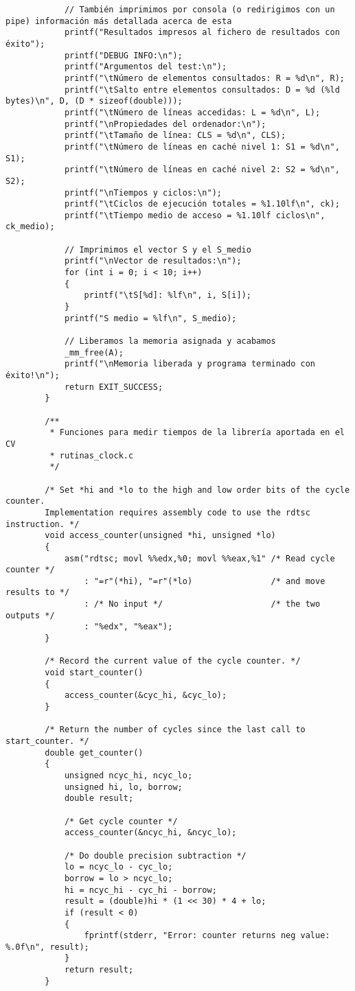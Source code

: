 \documentclass[a4paper,twocolumn]{article}
\begin{document}
\begin{lstlisting}
            // También imprimimos por consola (o redirigimos con un pipe) información más detallada acerca de esta
            printf("Resultados impresos al fichero de resultados con éxito");
            printf("DEBUG INFO:\n");
            printf("Argumentos del test:\n");
            printf("\tNúmero de elementos consultados: R = %d\n", R);
            printf("\tSalto entre elementos consultados: D = %d (%ld bytes)\n", D, (D * sizeof(double)));
            printf("\tNúmero de líneas accedidas: L = %d\n", L);
            printf("\nPropiedades del ordenador:\n");
            printf("\tTamaño de línea: CLS = %d\n", CLS);
            printf("\tNúmero de líneas en caché nivel 1: S1 = %d\n", S1);
            printf("\tNúmero de líneas en caché nivel 2: S2 = %d\n", S2);
            printf("\nTiempos y ciclos:\n");
            printf("\tCiclos de ejecución totales = %1.10lf\n", ck);
            printf("\tTiempo medio de acceso = %1.10lf ciclos\n", ck_medio);
        
            // Imprimimos el vector S y el S_medio
            printf("\nVector de resultados:\n");
            for (int i = 0; i < 10; i++)
            {
                printf("\tS[%d]: %lf\n", i, S[i]);
            }
            printf("S medio = %lf\n", S_medio);
        
            // Liberamos la memoria asignada y acabamos
            _mm_free(A);
            printf("\nMemoria liberada y programa terminado con éxito!\n");
            return EXIT_SUCCESS;
        }
        
        /**
         * Funciones para medir tiempos de la librería aportada en el CV
         * rutinas_clock.c
         */
        
        /* Set *hi and *lo to the high and low order bits of the cycle counter.
        Implementation requires assembly code to use the rdtsc instruction. */
        void access_counter(unsigned *hi, unsigned *lo)
        {
            asm("rdtsc; movl %%edx,%0; movl %%eax,%1" /* Read cycle counter */
                : "=r"(*hi), "=r"(*lo)                /* and move results to */
                : /* No input */                      /* the two outputs */
                : "%edx", "%eax");
        }
        
        /* Record the current value of the cycle counter. */
        void start_counter()
        {
            access_counter(&cyc_hi, &cyc_lo);
        }
        
        /* Return the number of cycles since the last call to start_counter. */
        double get_counter()
        {
            unsigned ncyc_hi, ncyc_lo;
            unsigned hi, lo, borrow;
            double result;
        
            /* Get cycle counter */
            access_counter(&ncyc_hi, &ncyc_lo);
        
            /* Do double precision subtraction */
            lo = ncyc_lo - cyc_lo;
            borrow = lo > ncyc_lo;
            hi = ncyc_hi - cyc_hi - borrow;
            result = (double)hi * (1 << 30) * 4 + lo;
            if (result < 0)
            {
                fprintf(stderr, "Error: counter returns neg value: %.0f\n", result);
            }
            return result;
        }
        \end{lstlisting}
\end{document}
